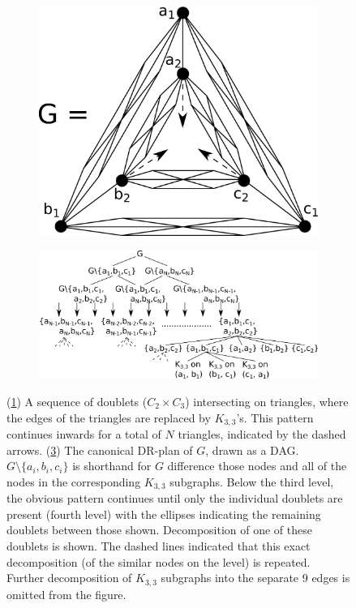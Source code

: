 \ClearMyMinHeight
{}

\begin{figure}\centering%
    \begin{subfigure}{0.3\linewidth}\centering
        \includegraphics[height=\myMinHeight]{../../img/svg/revised_c2c3_of_k33s}
        \caption{}\label{fig:c2c3ofk33s:a}
    \end{subfigure}%
    \hfill
    \begin{subfigure}{0.7\linewidth}\centering
        \includegraphics[height=\myMinHeight]{../../img/svg/revised_c2c3_of_k33s_candrp}
        \caption{}\label{fig:c2c3ofk33s:b}
    \end{subfigure}%
    \caption{
    (\ref{fig:c2c3ofk33s:a}) A sequence of doublets ($C_2 \times C_3$) intersecting on triangles, where the edges of the triangles are replaced by $K_{3,3}$'s. This pattern continues inwards for a total of $N$ triangles, indicated by the dashed arrows. (\ref{fig:c2c3ofk33s:b}) The canonical DR-plan of $G$, drawn as a DAG. $G\setminus\{a_i,b_i,c_i\}$ is shorthand for $G$ difference those nodes and all of the nodes in the corresponding $K_{3,3}$ subgraphs. Below the third level, the obvious pattern continues until only the individual doublets are present (fourth level) with the ellipses indicating the remaining doublets between those shown. Decomposition of one of these doublets is shown. The dashed lines indicated that this exact decomposition (of the similar nodes on the level) is repeated. Further decomposition of $K_{3,3}$ subgraphs into the separate 9 edges is omitted from the figure.
}
\end{figure}
